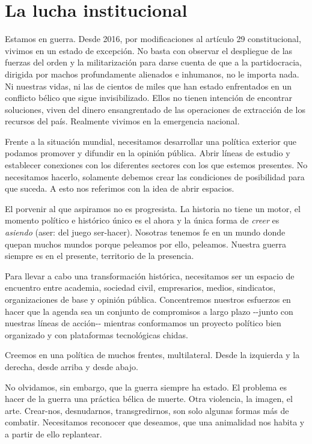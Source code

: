\hypertarget{la-lucha-institucional}{%
\section{La lucha institucional}\label{la-lucha-institucional}}

Estamos en guerra. Desde 2016, por modificaciones al artículo 29
constitucional, vivimos en un estado de excepción.\cite{ElUniversal2016}
No basta con observar el despliegue de las fuerzas del orden y la
militarización para darse cuenta de que a la partidocracia, dirigida por
machos profundamente alienados e inhumanos, no le importa nada. Ni
nuestras vidas, ni las de cientos de miles que han estado enfrentados en
un conflicto bélico que sigue invisibilizado. Ellos no tienen intención
de encontrar soluciones, viven del dinero ensangrentado de las
operaciones de extracción de los recursos del país. Realmente vivimos en
la emergencia nacional.

Frente a la situación mundial, necesitamos desarrollar una política
exterior que podamos promover y difundir en la opinión pública. Abrir
líneas de estudio y establecer conexiones con los diferentes sectores
con los que estemos presentes. No necesitamos hacerlo, solamente debemos
crear las condiciones de posibilidad para que suceda. A esto nos
referimos con la idea de abrir espacios.

El porvenir al que aspiramos no es progresista. La historia no tiene un
motor, el momento político e histórico único es el ahora y la única
forma de \emph{creer} es \emph{asiendo} (aser: del juego ser-hacer).
Nosotras tenemos fe en un mundo donde quepan muchos
mundos \cite{Redaccion2023} porque peleamos por ello,
peleamos. Nuestra guerra siempre es en el presente, territorio de la
presencia.

Para llevar a cabo una transformación histórica, necesitamos ser un
espacio de encuentro entre academia, sociedad civil, empresarios,
medios, sindicatos, organizaciones de base y opinión pública.
Concentremos nuestros esfuerzos en hacer que la agenda sea un conjunto
de compromisos a largo plazo -\/-junto con nuestras líneas de acción-\/-
mientras conformamos un proyecto político bien organizado y con
plataformas tecnológicas chidas.

Creemos en una política de muchos frentes, multilateral. Desde la
izquierda y la derecha, desde arriba y desde abajo.

No olvidamos, sin embargo, que la guerra siempre ha estado. El problema
es hacer de la guerra una práctica bélica de muerte. Otra violencia, la
imagen, el arte. Crear-nos, desnudarnos, transgredirnos, son solo
algunas formas más de combatir. Necesitamos reconocer que deseamos, que
una animalidad nos habita y a partir de ello replantear.

